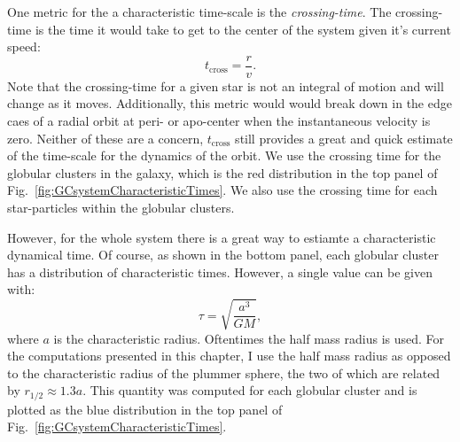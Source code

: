         One metric for the a characteristic time-scale is the \textit{crossing-time}. The crossing-time is the time it would take to get to the center of the system given it's current speed:
        \begin{equation}
            t_\mathrm{cross} = \frac{r}{v}.
        \end{equation}
        Note that the crossing-time for a given star is not an integral of motion and will change as it moves. Additionally, this metric would would break down in the edge caes of a radial orbit at peri- or apo-center when the instantaneous velocity is zero. Neither of these are a concern, $t_\mathrm{cross}$ still provides a great and quick estimate of the time-scale for the dynamics of the orbit. We use the crossing time for the globular clusters in the galaxy, which is the red distribution in the top panel of Fig.~\ref{fig:GCsystemCharacteristicTimes}. We also use the crossing time for each star-particles within the globular clusters.

        However, for the whole system there is a great way to estiamte a characteristic dynamical time. Of course, as shown in the bottom panel, each globular cluster has a distribution of characteristic times. However, a single value can be given with: 
        \begin{equation}
            \tau = \sqrt{\frac{a^3}{GM}},
        \end{equation}
        where $a$ is the characteristic radius. Oftentimes the half mass radius is used. For the computations presented in this chapter, I use the half mass radius as opposed to the characteristic radius of the plummer sphere, the two of which are related by $r_{\mathrm{1/2}}\approx 1.3 a$. This quantity was computed for each globular cluster and is plotted as the blue distribution in the top panel of Fig.~\ref{fig:GCsystemCharacteristicTimes}.

